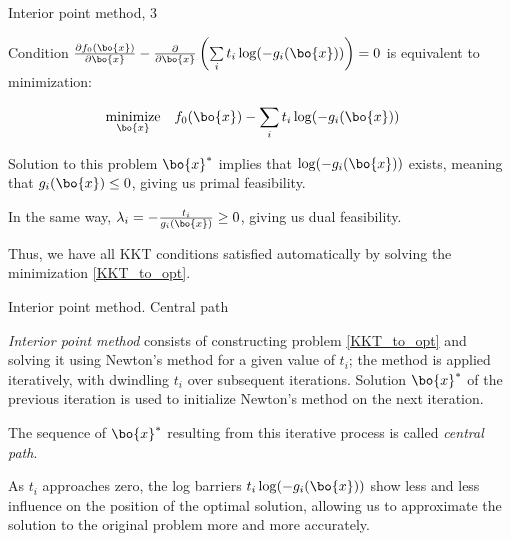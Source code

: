\documentclass{beamer}
\begin{document}
\begin{frame}{Interior point method, 3}
	\begin{flushleft}
		
		Condition $\frac{\partial f_0(\bo{x})}{\partial \bo{x}} 
		-
		\frac{\partial}{\partial \bo{x}} 
		\left(
		\sum\limits_i 
		t_i \log (- g_i (\bo{x})) 
		\right) = 0$ is equivalent to minimization:
		
		
		\begin{equation}
			\label{KKT_to_opt}
			\begin{aligned}
				& \underset{\bo{x}}{\text{minimize}}
				& & f_0(\bo{x}) - 
				\sum\limits_i t_i \log (- g_i (\bo{x})) 
			\end{aligned}
		\end{equation}
		
		Solution to this problem $\bo{x}^*$ implies that $\log (- g_i (\bo{x}))$ exists, meaning that $g_i (\bo{x}) \leq 0$, giving us primal feasibility.
		
		\bigskip
		
		In the same way, $\lambda_i = -\frac{t_i}{g_i(\bo{x})} \geq 0$, giving us dual feasibility.
		
		\bigskip
		
		Thus, we have all KKT conditions satisfied automatically by solving the minimization \eqref{KKT_to_opt}.
		
	\end{flushleft}
\end{frame}



\begin{frame}{Interior point method. Central path}
	\begin{flushleft}
		
		\emph{Interior point method} consists of constructing problem \eqref{KKT_to_opt} and solving it using Newton's method for a given value of $t_i$; the method is applied iteratively, with dwindling $t_i$ over subsequent iterations. Solution $\bo{x}^*$ of the previous iteration is used to initialize Newton's method on the next iteration.
		
		\bigskip
		
		The sequence of $\bo{x}^*$ resulting from this iterative process is called \emph{central path}. 
		
		\bigskip
		
		As $t_i$ approaches zero, the log barriers $t_i \log (- g_i (\bo{x}))$ show less and less influence on the position of the optimal solution, allowing us to approximate the solution to the original problem more and more accurately.
		
	\end{flushleft}
\end{frame}
\end{document}
